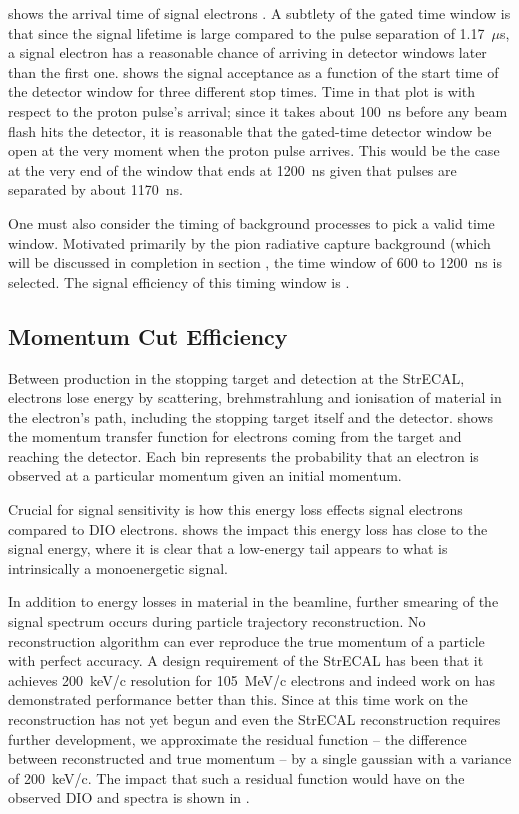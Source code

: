  shows the arrival time of signal electrons .
A subtlety of the gated time window is that since the signal lifetime is large compared to the pulse separation of 1.17~$\mu$s, a signal electron has a reasonable chance of arriving in detector windows later than the first one.
 shows the signal acceptance as a function of the start time of the detector window for three different stop times.
Time in that plot is with respect to the proton pulse's arrival; since it takes about 100~ns before any beam flash hits the detector, it is reasonable that the gated-time detector window be open at the very moment when the proton pulse arrives.
This would be the case at the very end of the window that ends at 1200~ns given that pulses are separated by about 1170~ns.

One must also consider the timing of background processes to pick a valid time window.
Motivated primarily by the pion radiative capture background (which will be discussed in completion in section , the time window of 600 to 1200~ns is selected.
The signal efficiency of this timing window is \VarAcceptanceTime.

\FigSensMomTransfer
\subsection{Momentum Cut Efficiency}
Between production in the stopping target and detection at the StrECAL, electrons lose energy by scattering, brehmstrahlung and ionisation of material in the electron's path, including the stopping target itself and the detector.
 shows the momentum transfer function for electrons coming from the target and reaching the detector.
Each bin represents the probability that an electron is observed at a particular momentum given an initial momentum.
\FigSensMomSpectra

Crucial for signal sensitivity is how this energy loss effects signal electrons compared to \ac{DIO} electrons.
 shows the impact this energy loss has close to the signal energy, where it is clear that a low-energy tail appears to what is intrinsically a monoenergetic signal.

In addition to energy losses in material in the beamline, further smearing of the signal spectrum occurs during particle trajectory reconstruction.
No reconstruction algorithm can ever reproduce the true momentum of a particle with perfect accuracy.
A design requirement of the StrECAL has been that it achieves 200~keV/c resolution for 105~MeV/c electrons and indeed work on \phaseI has demonstrated performance better than this.
Since at this time work on the \phaseII reconstruction has not yet begun and even the \phaseI StrECAL reconstruction requires further development, we approximate the residual function -- the difference between reconstructed and true momentum -- by a single gaussian with a variance of 200~keV/c.
The impact that such a residual function would have on the observed DIO and \mueconv spectra is shown in .

